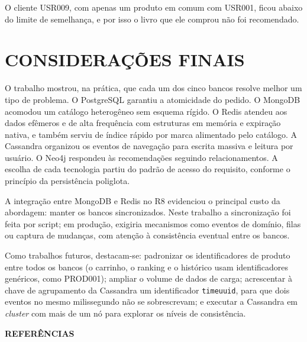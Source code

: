 \documentclass[12pt,a4paper,oneside]{article}
\begin{document}
O cliente USR009, com apenas um produto em comum com USR001, ficou abaixo do limite de semelhança, e por isso o livro que ele comprou não foi recomendado.

\section{CONSIDERAÇÕES FINAIS}

O trabalho mostrou, na prática, que cada um dos cinco bancos resolve melhor um tipo de problema. O PostgreSQL garantiu a atomicidade do pedido. O MongoDB acomodou um catálogo heterogêneo sem esquema rígido. O Redis atendeu aos dados efêmeros e de alta frequência com estruturas em memória e expiração nativa, e também serviu de índice rápido por marca alimentado pelo catálogo. A Cassandra organizou os eventos de navegação para escrita massiva e leitura por usuário. O Neo4j respondeu às recomendações seguindo relacionamentos. A escolha de cada tecnologia partiu do padrão de acesso do requisito, conforme o princípio da persistência poliglota.

A integração entre MongoDB e Redis no R8 evidenciou o principal custo da abordagem: manter os bancos sincronizados. Neste trabalho a sincronização foi feita por script; em produção, exigiria mecanismos como eventos de domínio, filas ou captura de mudanças, com atenção à consistência eventual entre os bancos.

Como trabalhos futuros, destacam-se: padronizar os identificadores de produto entre todos os bancos (o carrinho, o ranking e o histórico usam identificadores genéricos, como PROD001); ampliar o volume de dados de carga; acrescentar à chave de agrupamento da Cassandra um identificador \texttt{timeuuid}, para que dois eventos no mesmo milissegundo não se sobrescrevam; e executar a Cassandra em \textit{cluster} com mais de um nó para explorar os níveis de consistência.

\newpage
{}
{}
\begin{center}{\bfseries\MakeUppercase{Referências}}\end{center}
\vspace{4pt}
\end{document}

